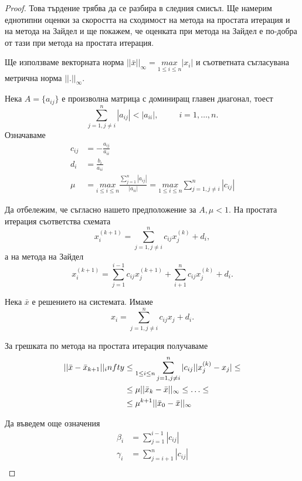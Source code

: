 \documentclass[12pt]{article}
\numberwithin{equation}{section}
\numberwithin{theorem}{section}
\numberwithin{definition}{section}
\numberwithin{corollary}{section}
\begin{document}
\begin{proof}
Това търдение трябва да се разбира в следния смисъл. Ще намерим еднотипни оценки за скоростта на сходимост на метода на простата итерация и на метода на Зайдел и ще покажем, че оценката при метода на Зайдел е по-добра от тази при метода на простата итерация.
\par
Ще използваме векторната норма $||\bar{x}||_\infty=\underset{1\leq i\leq n}{max}|x_i|$ и съответната съгласувана метрична норма $||.||_\infty$.
\par
Нека $A=\{a_{ij}\}$ е произволна матрица с доминиращ главен диагонал, тоест
\[
\displaystyle\sum_{j=1,j\neq i}^n|a_{ij}|<|a_{ii}|, \hspace{30pt}i=1,\dotso,n.
\]
Означаваме
\begin{align*}
c_{ij}&=-\frac{a_{ij}}{a_{ii}}\\
d_i&=\frac{b_i}{a_{ii}}\\
\mu &= \underset{i\leq i\leq n}{max}\frac{\displaystyle\sum_{j=1}^n|a_{ij}|}{|a_{ii}|}=\underset{1\leq i\leq n}{max}\displaystyle\sum_{j=1,j\neq i}^n|c_{ij}|
\end{align*}
\par
Да отбележим, че съгласно нашето предположение за $A, \mu<1$. На простата итерация съответства схемата
\[
x_i^{(k+1)} = \displaystyle\sum_{j=1,j\neq i}^nc_{ij}x_j^{(k)}+d_i,
\]
а на метода на Зайдел
\[
x_i^{(k+1)}=\displaystyle\sum_{j=1}^{i-1}c_{ij}x_j^{(k+1)}+
            \displaystyle\sum_{i+1}^nc_{ij}x_j^{(k)}+d_{i}.
\]
\par
Нека $\bar{x}$ е решението на системата. Имаме
\[
x_i=\displaystyle\sum_{j=1,j\neq i}^nc_{ij}x_j+d_i.
\]
\par
За грешката по метода на простата итерация получаваме
\begin{align*}
\begin{split}
||\bar{x}-\bar{x}_{k+1}||_infty&
    \leq \underset{1\leq i\leq n}\displaystyle\sum_{j=1,j\neq i}^n|c_{ij}||x_j^{(k)}-x_j|\leq\\&
    \leq\mu||\bar{x}_k-\bar{x}||_\infty\leq\dotso\leq\\&
    \leq\mu^{k+1}||\bar{x}_0-\bar{x}||_\infty
\end{split}
\end{align*} 
\par
Да въведем още означения
\begin{align*}
\beta_i&=\displaystyle\sum_{j=1}^{i-1}|c_{ij}|\\
\gamma_i&=\displaystyle\sum_{j=i+1}^n|c_{ij}|\\

\end{align*}
\end{proof}
\end{document}
